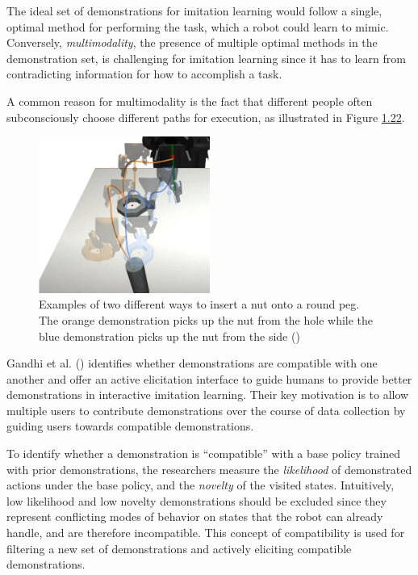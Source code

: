 \documentclass[
  letterpaper,
  DIV=11,
  numbers=noendperiod,
  oneside]{scrreprt}
\theoremstyle{remark}
\begin{document}
The ideal set of demonstrations for imitation learning would follow a
single, optimal method for performing the task, which a robot could
learn to mimic. Conversely, \emph{multimodality}, the presence of
multiple optimal methods in the demonstration set, is challenging for
imitation learning since it has to learn from contradicting information
for how to accomplish a task.

A common reason for multimodality is the fact that different people
often subconsciously choose different paths for execution, as
illustrated in Figure \hyperref[fig:multimodalexecution]{1.22}.

\begin{figure}

{\centering \includegraphics[width=0.5\textwidth,height=\textheight]{Figures/multimodal_peg.png}

}

\caption{Examples of two different ways to insert a nut onto a round
peg. The orange demonstration picks up the nut from the hole while the
blue demonstration picks up the nut from the side
()}

\end{figure}%

Gandhi et al. ()
identifies whether demonstrations are compatible with one another and
offer an active elicitation interface to guide humans to provide better
demonstrations in interactive imitation learning. Their key motivation
is to allow multiple users to contribute demonstrations over the course
of data collection by guiding users towards compatible demonstrations.

To identify whether a demonstration is ``compatible'' with a base policy
trained with prior demonstrations, the researchers measure the
\emph{likelihood} of demonstrated actions under the base policy, and the
\emph{novelty} of the visited states. Intuitively, low likelihood and
low novelty demonstrations should be excluded since they represent
conflicting modes of behavior on states that the robot can already
handle, and are therefore incompatible. This concept of compatibility is
used for filtering a new set of demonstrations and actively eliciting
compatible demonstrations.
\end{document}
